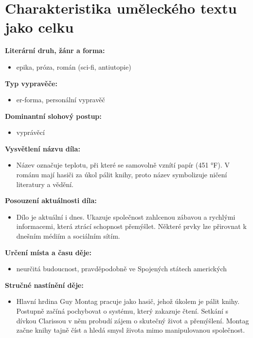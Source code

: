 \documentclass[12pt,a4paper]{article}
\begin{document}
\section*{Charakteristika uměleckého textu jako celku}

\begin{tcolorbox}[breakable]

\textbf{Literární druh, žánr a forma:}
\begin{itemize}
\item epika, próza, román (sci-fi, antiutopie)
\end{itemize}

\textbf{Typ vypravěče:}
\begin{itemize}
\item er-forma, personální vypravěč
\end{itemize}

\textbf{Dominantní slohový postup:}
\begin{itemize}
\item vyprávěcí
\end{itemize}

\textbf{Vysvětlení názvu díla:}
\begin{itemize}
\item Název označuje teplotu, při které se samovolně vznítí papír (451 °F). 
V románu mají hasiči za úkol pálit knihy, proto název symbolizuje ničení literatury a vědění.
\end{itemize}

\textbf{Posouzení aktuálnosti díla:}
\begin{itemize}
\item Dílo je aktuální i dnes. Ukazuje společnost zahlcenou zábavou a rychlými informacemi, 
která ztrácí schopnost přemýšlet. Některé prvky lze přirovnat k dnešním médiím a sociálním sítím.
\end{itemize}

\textbf{Určení místa a času děje:}
\begin{itemize}
\item neurčitá budoucnost, pravděpodobně ve Spojených státech amerických
\end{itemize}

\textbf{Stručné nastínění děje:}
\begin{itemize}
\item Hlavní hrdina Guy Montag pracuje jako hasič, jehož úkolem je pálit knihy. 
Postupně začíná pochybovat o systému, který zakazuje čtení. 
Setkání s dívkou Clarissou v něm probudí zájem o skutečný život a přemýšlení. 
Montag začne knihy tajně číst a hledá smysl života mimo manipulovanou společnost.
\end{itemize}


\end{tcolorbox}
\end{document}
